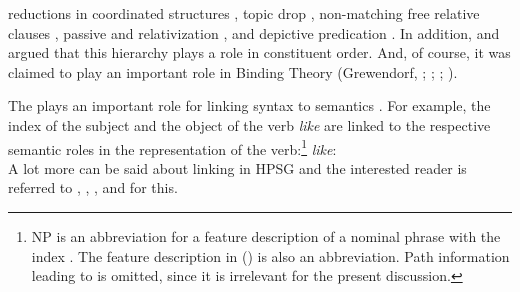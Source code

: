 \documentclass[output=paper,biblatex,babelshorthands,newtxmath,draftmode,colorlinks,citecolor=brown]{langscibook}
\begin{document}
reductions in coordinated structures \citep[]{Klein85},
topic drop \citep{Fries88b},
non-matching free relative clauses 
\parencites[Section~3]{Bausewein90}[]{Pittner95b}[--62]{Mueller99b}, 
passive and relativization \citep[, 68]{KC77a}, and
depictive predication \citep[Section~2]{Mueller2008a}.
In addition, \citet{Pullum77a} and \citet[]{ps} argued that this hierarchy plays a role in
constituent order.
And, of course, it was claimed to play an important role in Binding Theory 
(Grewendorf, \citeyear[]{Grewendorf83a}; \citeyear[]{Grewendorf85a}; \citeyear[]{Grewendorf88a}; \citealp[Chapter~6]{ps2}).

The \argstl plays an important role for linking syntax to semantics . For example, the index of the
subject and the object of the verb \emph{like} are linked to the respective semantic roles in the
representation of the verb:\footnote{%
  NP is an abbreviation for a feature description of a nominal phrase with the index . The feature description in () is also an
  abbreviation. Path information leading to \cont is omitted, since it is irrelevant for the present
  discussion.
%
}
\eas
\label{ex-like}
\emph{like}:\\
\zs 
A lot more can be said about linking in HPSG and the interested reader is referred to
, , , and  for this.
\end{document}
